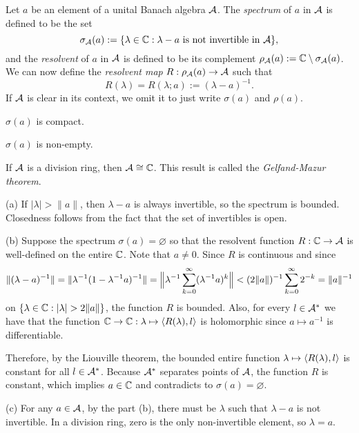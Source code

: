 \documentclass{../../large}
\begin{document}
\begin{prb}
Let $a$ be an element of a unital Banach algebra $\mathcal{A}$.
The \emph{spectrum} of $a$ in $\mathcal{A}$ is defined to be the set
\[\sigma_{\mathcal{A}}(a):=\{\lambda\in\mathbb{C}:\lambda-a\text{ is not invertible in }\mathcal{A}\},\]
and the \emph{resolvent} of $a$ in $\mathcal{A}$ is defined to be its complement $\rho_{\mathcal{A}}(a):=\mathbb{C}\setminus\sigma_{\mathcal{A}}(a)$.
We can now define the \emph{resolvent map} $R:\rho_{\mathcal{A}}(a)\to\mathcal{A}$ such that
\[R(\lambda)=R(\lambda;a):=(\lambda-a)^{-1}.\]
If $\mathcal{A}$ is clear in its context, we omit it to just write $\sigma(a)$ and $\rho(a)$.
\begin{parts}
\item $\sigma(a)$ is compact.
\item $\sigma(a)$ is non-empty.
\item If $\mathcal{A}$ is a division ring, then $\mathcal{A}\cong\mathbb{C}$. This result is called the \emph{Gelfand-Mazur theorem}.
\end{parts}
\end{prb}
\begin{pf}
(a)
If $|\lambda|>\|a\|$, then $\lambda-a$ is always invertible, so the spectrum is bounded.
Closedness follows from the fact that the set of invertibles is open.

(b)
Suppose the spectrum $\sigma(a)=\varnothing$ so that the resolvent function $R:\mathbb{C}\to\mathcal{A}$ is well-defined on the entire $\mathbb{C}$.
Note that $a\ne0$.
Since $R$ is continuous and since
\[\|(\lambda-a)^{-1}\|=\|\lambda^{-1}(1-\lambda^{-1}a)^{-1}\|
=\Bigl\|\lambda^{-1}\sum_{k=0}^\infty(\lambda^{-1}a)^k\Bigr\|
<(2\|a\|)^{-1}\sum_{k=0}^\infty2^{-k}=\|a\|^{-1}\]
on $\{\lambda\in\C:|\lambda|>2\|a\|\}$, the function $R$ is bounded.
Also, for every $l\in\mathcal{A}^*$ we have that the function $\mathbb{C}\to\mathbb{C}:\lambda\mapsto\langle R(\lambda),l\rangle$ is holomorphic since $a\mapsto a^{-1}$ is differentiable.

Therefore, by the Liouville theorem, the bounded entire function $\lambda\mapsto\langle R(\lambda),l\rangle$ is constant for all $l\in\mathcal{A}^*$.
Because $\mathcal{A}^*$ separates points of $\mathcal{A}$, the function $R$ is constant, which implies $a\in\mathbb{C}$ and contradicts to $\sigma(a)=\varnothing$.

(c)
For any $a\in\mathcal{A}$, by the part (b), there must be $\lambda$ such that $\lambda-a$ is not invertible.
In a division ring, zero is the only non-invertible element, so $\lambda=a$.
\end{pf}
\end{document}
